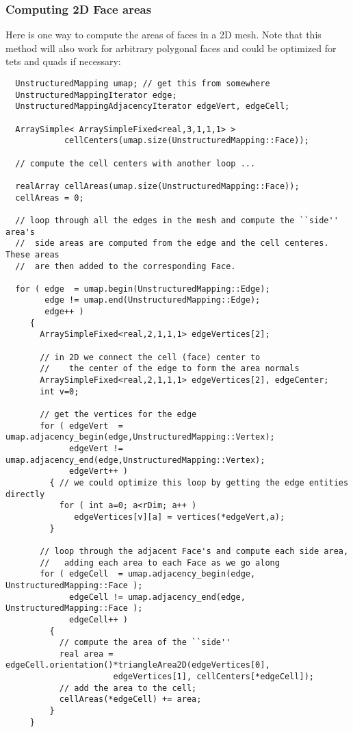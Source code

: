 \subsubsection{Computing 2D Face areas}
Here is one way to compute the areas of faces in a 2D mesh.  Note that
this method will also work for arbitrary polygonal faces and could be
optimized for tets and quads if necessary:
\begin{verbatim}
  UnstructuredMapping umap; // get this from somewhere
  UnstructuredMappingIterator edge;
  UnstructuredMappingAdjacencyIterator edgeVert, edgeCell;

  ArraySimple< ArraySimpleFixed<real,3,1,1,1> > 
            cellCenters(umap.size(UnstructuredMapping::Face));

  // compute the cell centers with another loop ...

  realArray cellAreas(umap.size(UnstructuredMapping::Face));
  cellAreas = 0;

  // loop through all the edges in the mesh and compute the ``side'' area's
  //  side areas are computed from the edge and the cell centeres.  These areas
  //  are then added to the corresponding Face.

  for ( edge  = umap.begin(UnstructuredMapping::Edge);
        edge != umap.end(UnstructuredMapping::Edge);
        edge++ )
     {
       ArraySimpleFixed<real,2,1,1,1> edgeVertices[2];

       // in 2D we connect the cell (face) center to 
       //    the center of the edge to form the area normals
       ArraySimpleFixed<real,2,1,1,1> edgeVertices[2], edgeCenter;
       int v=0;

       // get the vertices for the edge       
       for ( edgeVert  = umap.adjacency_begin(edge,UnstructuredMapping::Vertex);
             edgeVert != umap.adjacency_end(edge,UnstructuredMapping::Vertex);
             edgeVert++ ) 
         { // we could optimize this loop by getting the edge entities directly
           for ( int a=0; a<rDim; a++ )
              edgeVertices[v][a] = vertices(*edgeVert,a);
         }

       // loop through the adjacent Face's and compute each side area, 
       //   adding each area to each Face as we go along
       for ( edgeCell  = umap.adjacency_begin(edge, UnstructuredMapping::Face );
             edgeCell != umap.adjacency_end(edge, UnstructuredMapping::Face );
             edgeCell++ )
         {
           // compute the area of the ``side'' 
           real area = edgeCell.orientation()*triangleArea2D(edgeVertices[0], 
	                  edgeVertices[1], cellCenters[*edgeCell]);
           // add the area to the cell;
           cellAreas(*edgeCell) += area;
         }
     }

\end{verbatim}

